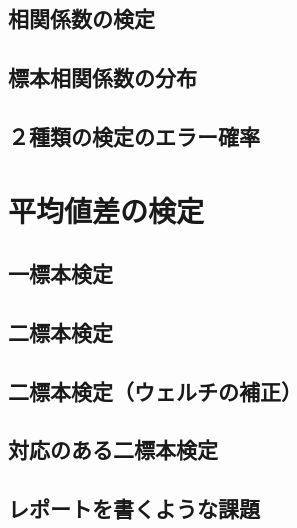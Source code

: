\documentclass[
  a4paper,
]{ltjsbook}
\begin{document}
\section{相関係数の検定}\label{ux76f8ux95a2ux4fc2ux6570ux306eux691cux5b9a}

\section{標本相関係数の分布}\label{ux6a19ux672cux76f8ux95a2ux4fc2ux6570ux306eux5206ux5e03}

\section{２種類の検定のエラー確率}\label{ux7a2eux985eux306eux691cux5b9aux306eux30a8ux30e9ux30fcux78baux7387}


\chapter{平均値差の検定}\label{ux5e73ux5747ux5024ux5deeux306eux691cux5b9a}

\section{一標本検定}\label{ux4e00ux6a19ux672cux691cux5b9a}

\section{二標本検定}\label{ux4e8cux6a19ux672cux691cux5b9a}

\section{二標本検定（ウェルチの補正）}\label{ux4e8cux6a19ux672cux691cux5b9aux30a6ux30a7ux30ebux30c1ux306eux88dcux6b63}

\section{対応のある二標本検定}\label{ux5bfeux5fdcux306eux3042ux308bux4e8cux6a19ux672cux691cux5b9a}

\section{レポートを書くような課題}\label{ux30ecux30ddux30fcux30c8ux3092ux66f8ux304fux3088ux3046ux306aux8ab2ux984c}
\end{document}
